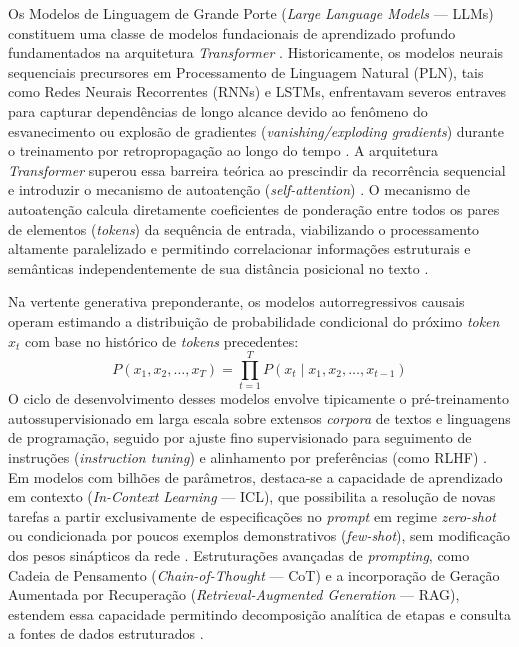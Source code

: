 Os Modelos de Linguagem de Grande Porte (\textit{Large Language Models} --- LLMs) constituem uma classe de modelos fundacionais de aprendizado profundo fundamentados na arquitetura \textit{Transformer} \cite{vaswani2017attention, Gallotta_2024}. Historicamente, os modelos neurais sequenciais precursores em Processamento de Linguagem Natural (PLN), tais como Redes Neurais Recorrentes (RNNs) e LSTMs, enfrentavam severos entraves para capturar dependências de longo alcance devido ao fenômeno do esvanecimento ou explosão de gradientes (\textit{vanishing/exploding gradients}) durante o treinamento por retropropagação ao longo do tempo \cite{bengio1994learning}. A arquitetura \textit{Transformer} superou essa barreira teórica ao prescindir da recorrência sequencial e introduzir o mecanismo de autoatenção (\textit{self-attention}) \cite{vaswani2017attention}. O mecanismo de autoatenção calcula diretamente coeficientes de ponderação entre todos os pares de elementos (\textit{tokens}) da sequência de entrada, viabilizando o processamento altamente paralelizado e permitindo correlacionar informações estruturais e semânticas independentemente de sua distância posicional no texto \cite{vaswani2017attention, Gallotta_2024}.

Na vertente generativa preponderante, os modelos autorregressivos causais operam estimando a distribuição de probabilidade condicional do próximo \textit{token} $x_t$ com base no histórico de \textit{tokens} precedentes:
\begin{equation}
    P(x_1, x_2, \dots, x_T) = \prod_{t=1}^{T} P(x_t \mid x_1, x_2, \dots, x_{t-1})
\end{equation}
O ciclo de desenvolvimento desses modelos envolve tipicamente o pré-treinamento autossupervisionado em larga escala sobre extensos \textit{corpora} de textos e linguagens de programação, seguido por ajuste fino supervisionado para seguimento de instruções (\textit{instruction tuning}) e alinhamento por preferências (como RLHF) \cite{brown2020language, Gallotta_2024, her2025zeroshot3dmapgeneration}. Em modelos com bilhões de parâmetros, destaca-se a capacidade de aprendizado em contexto (\textit{In-Context Learning} --- ICL), que possibilita a resolução de novas tarefas a partir exclusivamente de especificações no \textit{prompt} em regime \textit{zero-shot} ou condicionada por poucos exemplos demonstrativos (\textit{few-shot}), sem modificação dos pesos sinápticos da rede \cite{brown2020language}. Estruturações avançadas de \textit{prompting}, como Cadeia de Pensamento (\textit{Chain-of-Thought} --- CoT) e a incorporação de Geração Aumentada por Recuperação (\textit{Retrieval-Augmented Generation} --- RAG), estendem essa capacidade permitindo decomposição analítica de etapas e consulta a fontes de dados estruturados \cite{Gallotta_2024, tang2025unrealllm, wang2026designerlyloop}.

